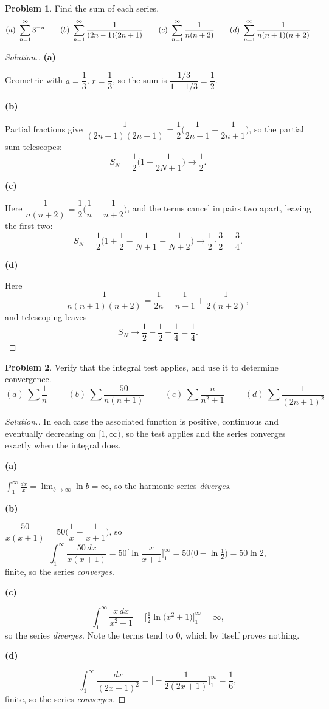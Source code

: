 \documentclass[11pt,a4paper]{article}
\theoremstyle{definition}
\newtheorem{problemx}{Problem}[subsection]
\newenvironment{problem}{\begin{problemx}}{\end{problemx}}
\newenvironment{solution}
  {\renewcommand{\qedsymbol}{}\begin{proof}[\textit{Solution}.]}
  {\end{proof}}
\newcommand{\subhead}[1]{%
  \par\medskip\noindent\textbf{#1}\par\nobreak\smallskip}
\begin{document}
\begin{problem}
Find the sum of each series.
$$(a)\ \sum_{n=1}^{\infty}3^{-n}\hspace{0.7cm}
(b)\ \sum_{n=1}^{\infty}\frac{1}{(2n-1)(2n+1)}\hspace{0.7cm}
(c)\ \sum_{n=1}^{\infty}\frac{1}{n(n+2)}\hspace{0.7cm}
(d)\ \sum_{n=1}^{\infty}\frac{1}{n(n+1)(n+2)}$$
\end{problem}
\begin{solution}
\subhead{(a)}
Geometric with $a = \dfrac13$, $r = \dfrac13$, so the sum is
$\dfrac{1/3}{1-1/3} = \dfrac12$.

\subhead{(b)}
Partial fractions give
$\dfrac{1}{(2n-1)(2n+1)} = \dfrac12\Big(\dfrac{1}{2n-1} - \dfrac{1}{2n+1}\Big)$,
so the partial sum telescopes:
$$S_N = \frac12\Big(1 - \frac{1}{2N+1}\Big)\longrightarrow \frac12 .$$

\subhead{(c)}
Here $\dfrac{1}{n(n+2)} = \dfrac12\Big(\dfrac1n - \dfrac{1}{n+2}\Big)$, and the
terms cancel in pairs two apart, leaving the first two:
$$S_N = \frac12\Big(1 + \frac12 - \frac{1}{N+1} - \frac{1}{N+2}\Big)
\longrightarrow \frac12\cdot\frac32 = \frac34 .$$

\subhead{(d)}
Here
$$\frac{1}{n(n+1)(n+2)}
= \frac{1}{2n} - \frac{1}{n+1} + \frac{1}{2(n+2)} ,$$
and telescoping leaves
$$S_N \longrightarrow \frac12 - \frac12 + \frac14 = \frac14 .$$
\end{solution}

\begin{problem}
Verify that the integral test applies, and use it to determine convergence.
$$(a)\ \sum\frac1n\hspace{1cm}(b)\ \sum\frac{50}{n(n+1)}\hspace{1cm}
(c)\ \sum\frac{n}{n^2+1}\hspace{1cm}(d)\ \sum\frac{1}{(2n+1)^2}$$
\end{problem}
\begin{solution}
In each case the associated function is positive, continuous and eventually
decreasing on $[1,\infty)$, so the test applies and the series converges exactly
when the integral does.

\subhead{(a)}
$\displaystyle{\int_1^{\infty}\frac{dx}{x} = \lim_{b\rightarrow\infty}\ln b
= \infty}$, so the harmonic series \emph{diverges}.

\subhead{(b)}
$\dfrac{50}{x(x+1)} = 50\Big(\dfrac1x - \dfrac{1}{x+1}\Big)$, so
$$\int_1^{\infty}\frac{50\,dx}{x(x+1)}
= 50\Big[\ln\frac{x}{x+1}\Big]_1^{\infty} = 50\big(0 - \ln\tfrac12\big)
= 50\ln 2 ,$$
finite, so the series \emph{converges}.

\subhead{(c)}
$$\int_1^{\infty}\frac{x\,dx}{x^2+1}
= \Big[\tfrac12\ln\big(x^2+1\big)\Big]_1^{\infty} = \infty ,$$
so the series \emph{diverges}. Note the terms tend to $0$, which by itself
proves nothing.

\subhead{(d)}
$$\int_1^{\infty}\frac{dx}{(2x+1)^2}
= \Big[-\frac{1}{2(2x+1)}\Big]_1^{\infty} = \frac16 ,$$
finite, so the series \emph{converges}.
\end{solution}
\end{document}
